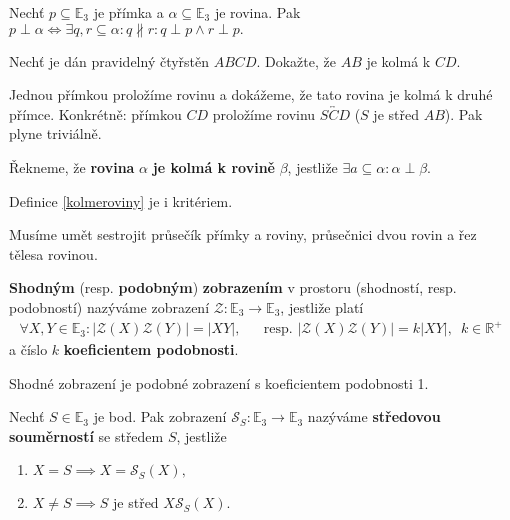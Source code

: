 \begin{veta}
    Nechť $p\subseteq \mathbb E_3$ je přímka a $\alpha \subseteq \mathbb E_3$ je rovina.
    Pak  $p\perp \alpha \iff \exists q,r \subseteq \alpha: q \nparallel r: q\perp p\land
    r\perp p.$
\end{veta}

\begin{priklad}
Nechť je dán pravidelný čtyřstěn $ABCD$. Dokažte, že $AB$ je kolmá k $CD$.
\end{priklad}

\begin{reseni}
Jednou přímkou proložíme rovinu a dokážeme, že tato rovina je kolmá k druhé přímce.
Konkrétně: přímkou $CD$ proložíme rovinu $\overleftrightarrow{SCD}$ ($S$ je střed
$AB$). Pak plyne triviálně.
\end{reseni}

\begin{definition}\label{kolmeroviny}
    Řekneme, že \textbf{rovina} $\alpha$ \textbf{je kolmá k rovině} $\beta$, jestliže
    $\exists a\subseteq\alpha: \alpha \perp\beta.$
\end{definition}

\begin{pozn}
    Definice \ref{kolmeroviny} je i kritériem.
\end{pozn}

\begin{pozn}
    Musíme umět sestrojit průsečík přímky a roviny, průsečnici dvou rovin a řez
    tělesa rovinou.
\end{pozn}

\begin{definition}
\textbf{Shodným} (resp. \textbf{podobným}) \textbf{zobrazením} v prostoru (shodností,
resp. podobností) nazýváme zobrazení $\mathscr Z:
\mathbb E_3 \to \mathbb E_3$, jestliže platí
\begin{align*}
    \forall X, Y \in \mathbb E_3: |\mathscr Z(X)\mathscr Z(Y)| =|XY|, & & \textrm{resp. } |\mathscr Z(X)\mathscr Z(Y)|=k|XY|, \,\,\, k \in \mathbb R^+
\end{align*}
a číslo $k$ \textbf{koeficientem podobnosti}.
\end{definition}

\begin{pozn}
    Shodné zobrazení je podobné zobrazení s koeficientem podobnosti 1.
\end{pozn}

\begin{definition}
    Nechť $S\in \mathbb E_3$ je bod. Pak zobrazení $\mathscr S_S: \mathbb E_3 \to
    \mathbb E_3$ nazýváme \textbf{středovou souměrností} se středem $S$, jestliže
    \begin{enumerate}[$i.$]
    \item $X=S\implies X=\mathscr S_S(X),$
   	\item $X\ne S \implies S$ je střed $X\mathscr S_S(X).$
    \end{enumerate}
\end{definition}


